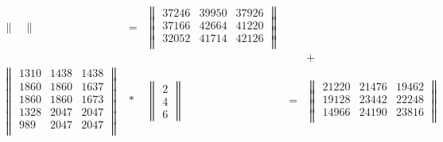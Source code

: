 \documentclass[12pt, a4paper]{extarticle}
\begin{document}
\begin{enumerate}
\begin{equation}
\begin{array}{rcccccc}
\begin{Vmatrix}
            \end{Vmatrix} 
            & = &
            \begin{Vmatrix}
                37246 & 39950 & 37926 \\
                37166 & 42664 & 41220 \\
                32052 & 41714 & 42126 \\
            \end{Vmatrix} \\
            & & & & + & & \\
            \begin{Vmatrix}
                1310 & 1438 & 1438 \\
                1860 & 1860 & 1637 \\
                1860 & 1860 & 1673 \\
                1328 & 2047 & 2047 \\
                989 & 2047 & 2047 \\
            \end{Vmatrix}
            & \ast & 
            \begin{Vmatrix}
                2 \\ 4 \\ 6
            \end{Vmatrix} 
            & = &
            \begin{Vmatrix}
                21220 & 21476 & 19462 \\
                19128 & 23442 & 22248 \\
                14966 & 24190 & 23816 \\
            \end{Vmatrix} & & 
        \end{array}
        \end{equation}
        

\end{enumerate}
\end{document}

